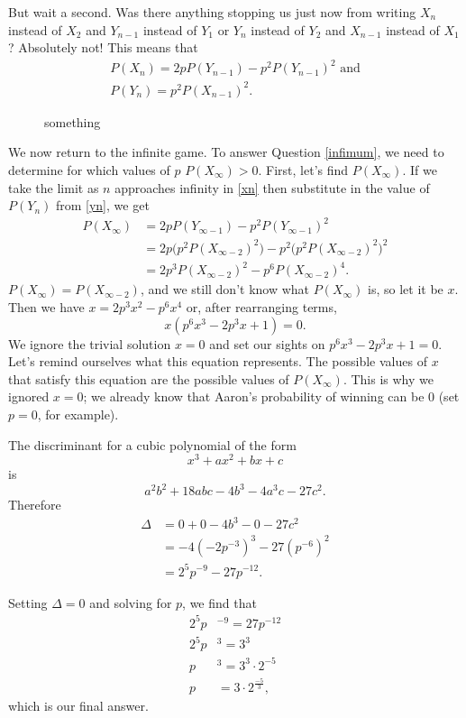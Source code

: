 \documentclass{book}
\begin{document}
But wait a second. Was there anything stopping us just now from writing $X_n$ instead of $X_2$ and $Y_{n-1}$ instead of $Y_1$ or $Y_n$ instead of $Y_2$ and $X_{n-1}$ instead of $X_1$? Absolutely not! This means that
\begin{gather}
P(X_n) = 2pP(Y_{n-1}) - p^2P(Y_{n-1})^2\text{ and}\label{xn}\\
P(Y_n) = p^2P(X_{n-1})^2.\label{yn}
\end{gather}

\begin{figure}[ht]
\centering
{}
\caption{something}
\end{figure}

We now return to the infinite game. To answer Question \ref{infimum}, we need to determine for which values of $p$ $P(X_\infty) > 0$. First, let's find $P(X_\infty)$. If we take the limit as $n$ approaches infinity in \eqref{xn} then substitute in the value of $P(Y_n)$ from \eqref{yn}, we get
\begin{align*}
P(X_\infty) &= 2pP(Y_{\infty-1}) - p^2P(Y_{\infty-1})^2\\
&= 2p\Big(p^2P(X_{\infty-2})^2\Big) - p^2\Big(p^2P(X_{\infty-2})^2\Big)^2\\
&= 2p^3P(X_{\infty-2})^2 - p^6P(X_{\infty-2})^4.
\end{align*}
$P(X_\infty) = P(X_{\infty-2})$, and we still don't know what $P(X_\infty)$ is, so let it be $x$. Then we have $x = 2p^3x^2 - p^6x^4$ or, after rearranging terms,
\begin{equation*}
x(p^6x^3 - 2p^3x + 1) = 0.
\end{equation*}
We ignore the trivial solution $x = 0$ and set our sights on $p^6x^3 - 2p^3x + 1 = 0$. Let's remind ourselves what this equation represents. The possible values of $x$ that satisfy this equation are the possible values of $P(X_\infty)$. This is why we ignored $x=0$; we already know that Aaron's probability of winning can be $0$ (set $p = 0$, for example). 

The discriminant for a cubic polynomial of the form \[x^3 + ax^2 + bx + c\] is \[a^2b^2 + 18abc - 4b^3 - 4a^3c - 27c^2.\] Therefore
\begin{align*}
\Delta &= 0 + 0 -4b^3 - 0 - 27c^2\\
&=-4(-2p^{-3})^3 - 27(p^{-6})^2\\
&=2^5p^{-9} - 27p^{-12}.
\end{align*}

Setting $\Delta = 0$ and solving for $p$, we find that
\begin{align*}
2^5p&^{-9} = 27p^{-12}\\
2^5p&^3 = 3^3\\
p&^3 = 3^3\cdot 2^{-5}\\
p& = 3\cdot 2^{\frac{-5}{3}},
\end{align*}
which is our final answer.
\end{document}
